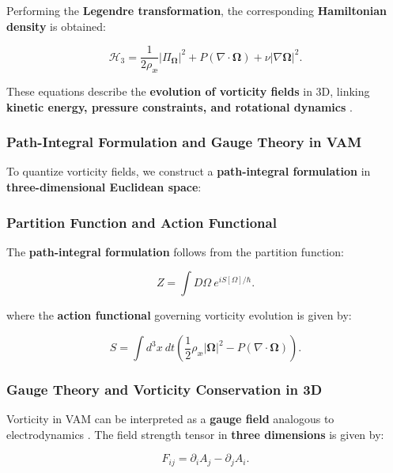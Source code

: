     Performing the \textbf{Legendre transformation}, the corresponding \textbf{Hamiltonian density} is obtained:

    \begin{equation*}
        \mathcal{H}_3 = \frac{1}{2 \rho_\text{æ}} |\Pi_{\boldsymbol{\Omega}}|^2 + P (\nabla \cdot \boldsymbol{\Omega}) + \nu |\nabla \boldsymbol{\Omega}|^2.
    \end{equation*}

    These equations describe the \textbf{evolution of vorticity fields} in 3D, linking \textbf{kinetic energy, pressure constraints, and rotational dynamics} \cite{lamb1945hydrodynamics}.

    \subsubsection*{Path-Integral Formulation and Gauge Theory in VAM}
    To quantize vorticity fields, we construct a \textbf{path-integral formulation} in \textbf{three-dimensional Euclidean space}:

    \subsubsection*{Partition Function and Action Functional}
    The \textbf{path-integral formulation} follows from the partition function:

    \begin{equation*}
        Z = \int D\Omega \ e^{iS[\Omega]/\hbar}.
    \end{equation*}

    where the \textbf{action functional} governing vorticity evolution is given by:

    \begin{equation*}
        S = \int d^3x \ dt \left( \frac{1}{2} \rho_\text{æ} |\boldsymbol{\Omega}|^2 - P (\nabla \cdot \boldsymbol{\Omega}) \right).
    \end{equation*}

    \subsubsection*{Gauge Theory and Vorticity Conservation in 3D}
    Vorticity in VAM can be interpreted as a \textbf{gauge field} analogous to electrodynamics \cite{jackson1999classical}. The field strength tensor in \textbf{three dimensions} is given by:

    \begin{equation*}
        F_{ij} = \partial_i A_j - \partial_j A_i.
    \end{equation*}

